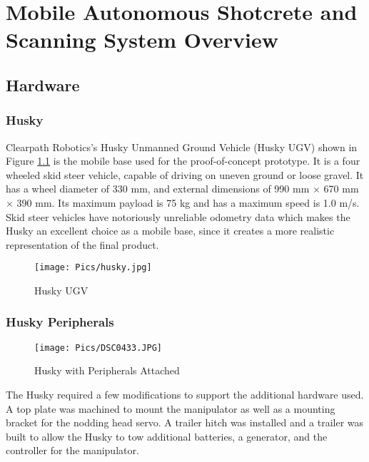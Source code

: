 \chapter{Mobile Autonomous Shotcrete and Scanning System Overview}
\label{chap:overview}
\section{Hardware}
\subsection{Husky}
Clearpath Robotics's Husky Unmanned Ground Vehicle (Husky UGV) shown in Figure \ref{fig:husky} is the mobile base used for the proof-of-concept prototype. It is a four wheeled skid steer vehicle, capable of driving on uneven ground or loose gravel. It has a wheel diameter of 330 mm, and external dimensions of 990 mm $\times$ 670 mm $\times$ 390 mm. Its maximum payload is 75 kg and has a maximum speed is 1.0 m/s. Skid steer vehicles have notoriously unreliable odometry data which makes the Husky an excellent choice as a mobile base, since it creates a more realistic representation of the final product.\\
\begin{figure}[H]
    \centering
    \texttt{[image: Pics/husky.jpg]}
    \caption{Husky UGV \cite{huskypage}}
    \label{fig:husky}
\end{figure}
\subsection{Husky Peripherals}

\begin{figure}[H]
    \centering
    \texttt{[image: Pics/DSC0433.JPG]}
    \caption{Husky with Peripherals Attached}
    \label{fig:peripherals}
\end{figure}
The Husky required a few modifications to support the additional hardware used. A top plate was machined to mount the manipulator as well as a mounting bracket for the nodding head servo. A trailer hitch was installed and a trailer was built to allow the Husky to tow additional batteries, a generator, and the controller for the manipulator.\\
